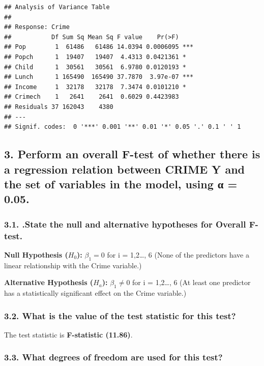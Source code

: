 \documentclass[
]{article}
\begin{document}
\begin{verbatim}
## Analysis of Variance Table
## 
## Response: Crime
##           Df Sum Sq Mean Sq F value    Pr(>F)    
## Pop        1  61486   61486 14.0394 0.0006095 ***
## Popch      1  19407   19407  4.4313 0.0421361 *  
## Child      1  30561   30561  6.9780 0.0120193 *  
## Lunch      1 165490  165490 37.7870  3.97e-07 ***
## Income     1  32178   32178  7.3474 0.0101210 *  
## Crimech    1   2641    2641  0.6029 0.4423983    
## Residuals 37 162043    4380                      
## ---
## Signif. codes:  0 '***' 0.001 '**' 0.01 '*' 0.05 '.' 0.1 ' ' 1
\end{verbatim}

\subsection{3. Perform an overall F-test of whether there is a
regression relation between CRIME Y and the set of variables in the
model, using α =
0.05.}\label{perform-an-overall-f-test-of-whether-there-is-a-regression-relation-between-crime-y-and-the-set-of-variables-in-the-model-using-ux3b1-0.05.}

\subsubsection{\texorpdfstring{3.1. .State the null and alternative
hypotheses \textbf{for Overall
F-test}.}{3.1. .State the null and alternative hypotheses for Overall F-test.}}\label{state-the-null-and-alternative-hypotheses-for-overall-f-test.}

\textbf{Null Hypothesis (\(H_0\)):} \(\beta_1 = 0\) for i = 1,2\ldots, 6
(None of the predictors have a linear relationship with the Crime
variable.)

\textbf{Alternative Hypothesis (\(H_a\)):} \(\beta_1 \neq 0\) for i =
1,2\ldots, 6 (At least one predictor has a statistically significant
effect on the Crime variable.)

\subsubsection{3.2. What is the value of the test statistic for this
test?}\label{what-is-the-value-of-the-test-statistic-for-this-test}

The test statistic is \textbf{F-statistic (11.86)}.

\subsubsection{3.3. What degrees of freedom are used for this
test?}\label{what-degrees-of-freedom-are-used-for-this-test}
\end{document}
